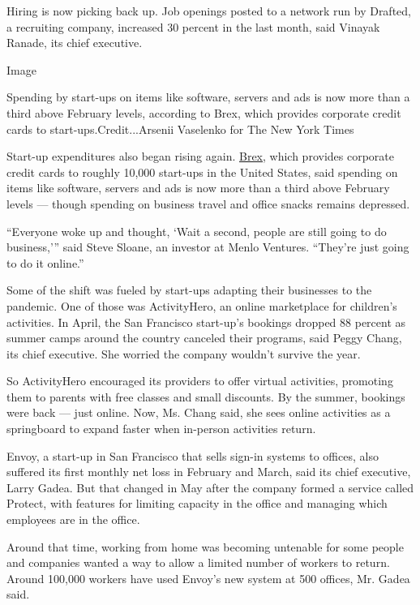 Hiring is now picking back up. Job openings posted to a network run by
Drafted, a recruiting company, increased 30 percent in the last month,
said Vinayak Ranade, its chief executive.

Image

Spending by start-ups on items like software, servers and ads is now
more than a third above February levels, according to Brex, which
provides corporate credit cards to start-ups.Credit...Arsenii Vaselenko
for The New York Times

Start-up expenditures also began rising again.
\href{https://www.nytimes3xbfgragh.onion/2019/08/02/technology/brex-start-up.html}{Brex},
which provides corporate credit cards to roughly 10,000 start-ups in the
United States, said spending on items like software, servers and ads is
now more than a third above February levels --- though spending on
business travel and office snacks remains depressed.

``Everyone woke up and thought, `Wait a second, people are still going
to do business,''' said Steve Sloane, an investor at Menlo Ventures.
``They're just going to do it online.''

Some of the shift was fueled by start-ups adapting their businesses to
the pandemic. One of those was ActivityHero, an online marketplace for
children's activities. In April, the San Francisco start-up's bookings
dropped 88 percent as summer camps around the country canceled their
programs, said Peggy Chang, its chief executive. She worried the company
wouldn't survive the year.

So ActivityHero encouraged its providers to offer virtual activities,
promoting them to parents with free classes and small discounts. By the
summer, bookings were back --- just online. Now, Ms. Chang said, she
sees online activities as a springboard to expand faster when in-person
activities return.

Envoy, a start-up in San Francisco that sells sign-in systems to
offices, also suffered its first monthly net loss in February and March,
said its chief executive, Larry Gadea. But that changed in May after the
company formed a service called Protect, with features for limiting
capacity in the office and managing which employees are in the office.

Around that time, working from home was becoming untenable for some
people and companies wanted a way to allow a limited number of workers
to return. Around 100,000 workers have used Envoy's new system at 500
offices, Mr. Gadea said.

